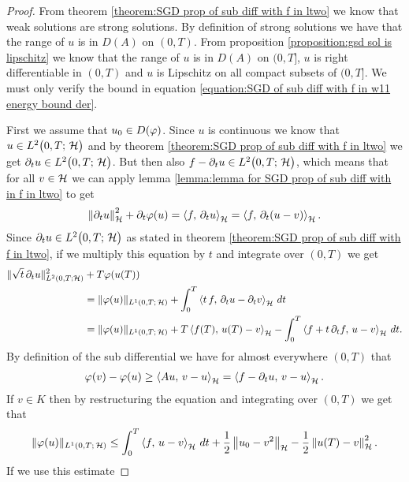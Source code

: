 \begin{proof}
	From theorem \ref{theorem:SGD prop of sub diff with f in ltwo}
	we know that weak solutions are strong solutions. 
	By definition of strong solutions we have that 
	the range of $ u $ is in $ D(A) $ on $ (0,T) $. From
	proposition \ref{proposition:gsd sol is lipschitz}
	we know that the range of $ u$ is in $ D(A) $ on $ (0,T] $,
	$ u $ is right differentiable in $ (0,T) $ and 
	$ u $ is Lipschitz on all compact subsets
	of $ (0,T] $. We must only verify the bound
	in equation 
	\eqref{equation:SGD of sub diff with f in w11 energy bound der}.
	\smallskip
	
	First we assume that $ u_0\in D(\varphi) $. Since $ u $ is continuous we know that
	$ u\in L^{2}\big(0,T;\,\mathcal{H}\big) $ and by theorem \ref{theorem:SGD prop of sub diff with f in ltwo}
	we get $ \partial_t u\in L^{2}\big(0,T;\,\mathcal{H}\big) $. But then also $ f-\partial_t u\in L^{2}\big(0,T;\,\mathcal{H}\big) $,
	which means that for all $ v\in\mathcal{H} $ we can apply lemma
	\ref{lemma:lemma for SGD prop of sub diff with in f in ltwo} to get
	\begin{align*}
		\left\Vert \partial_t u\right\Vert_{\mathcal{H}}^2+\partial_t\varphi(u)
		=\left\langle f,\,\partial_t u\right\rangle_{\mathcal{H}}
		=\left\langle f,\,\partial_t (u-v)\right\rangle_{\mathcal{H}}.
	\end{align*}
	Since $ \partial_t u\in L^{2}\big(0,T;\,\mathcal{H}\big) $ as stated in theorem
	\ref{theorem:SGD prop of sub diff with f in ltwo},
	if we multiply this equation by $ t $ and integrate 
	over $ (0,T) $ we get
	\begin{align}\label{eq1:theorem:SGD prop of sub diff with f in w11}
		\begin{split}
			\Vert \sqrt{t}\,\partial_t u\Vert_{L^2(0,T;\mathcal{H})}^2
			&+T\varphi(u(T))\\
			&=\Vert \varphi(u)\Vert_{L^1(0,T;\,\mathcal{H})}
			+\int_0^T \left\langle t\,f,\,\partial_t u-\partial_t v\right\rangle_{\mathcal{H}}\,dt\\
			&=\Vert \varphi(u)\Vert_{L^1(0,T;\,\mathcal{H})}
			+T\left\langle f(T),\,u(T)-v\right\rangle_{\mathcal{H}}-\int_0^T \left\langle f+t\, \partial_t f,\,u-v\right\rangle_{\mathcal{H}}\,dt.
		\end{split}
	\end{align} 
	By definition of the sub differential we have 
	for almost everywhere $ (0,T) $ that
	\begin{align*}
		\varphi(v)-\varphi(u)
		\geq \left\langle Au,\,v-u\right\rangle_{\mathcal{H}}
		=\left\langle f-\partial_t u,\,v-u\right\rangle_{\mathcal{H}}.
	\end{align*}
	If $ v\in K $ then by restructuring the equation
	and integrating over $ (0,T) $ we get that
	\begin{align}\label{eq2:theorem:SGD prop of sub diff with f in w11}
		\Vert \varphi(u)\Vert_{L^1(0,T;\,\mathcal{H})}
		\leq \int_0^T \left\langle f,\,u-v\right\rangle_{\mathcal{H}}\,dt
		+\frac{1}{2}\left\Vert u_0-v^2\right\Vert_{\mathcal{H}}-\frac{1}{2}\left\Vert u(T)-v\right\Vert_{\mathcal{H}}^2.
	\end{align}
	If we use this estimate 

\end{proof}

